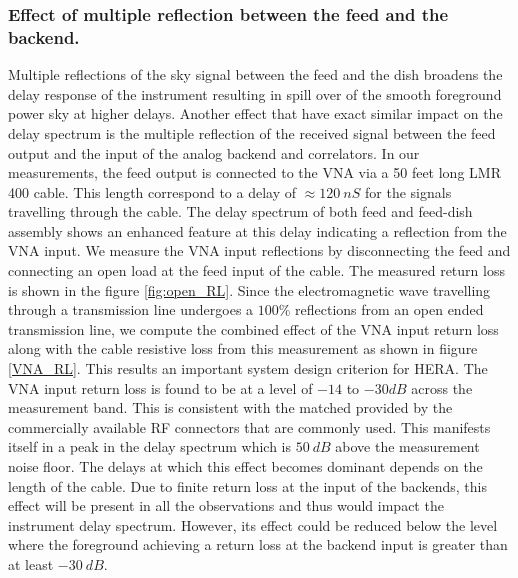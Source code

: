 \documentclass[twocolumn]{emulateapj}
\begin{document}
\subsubsection{\textbf{Effect of multiple reflection between the feed and the backend.}}
Multiple reflections of the sky signal between the feed and the dish broadens the delay response of the instrument resulting in spill over of the smooth foreground power sky at higher delays. Another effect that have exact similar impact on the delay spectrum is the multiple reflection of the received signal between the feed output and the input of the analog backend and correlators. In our measurements, the feed output is connected to the VNA via a 50 feet long LMR 400 cable. This length correspond to a delay of $\approx 120~nS$ for the signals travelling through the cable. The delay spectrum of both feed and feed-dish assembly shows an enhanced feature at this delay indicating a reflection from the VNA input. We measure the VNA input reflections by disconnecting the feed and connecting an open load at the feed input of the cable. The measured return loss is shown in the figure \ref{fig:open_RL}. Since the electromagnetic wave travelling through a transmission line undergoes a $100\%$ reflections from an open ended transmission line, we compute the combined effect of the VNA input return loss along with the cable resistive loss from this measurement as shown in fiigure \ref{VNA_RL}. This results an important system design criterion for HERA. The VNA input return loss is found to be at a level of $-14$ to $-30dB$ across the measurement band. This is consistent with the matched provided by the commercially available RF connectors that are commonly used. This manifests itself in a peak in the delay spectrum which is $50~dB$ above the measurement noise floor. The delays at which this effect becomes dominant depends on the length of the cable. Due to finite return loss at the input of the backends, this effect will be present in all the observations and thus would impact the instrument delay spectrum. However, its effect could be reduced below the level where the foreground  achieving a return loss at the backend input is greater than at least $-30~dB$. 
\end{document}
